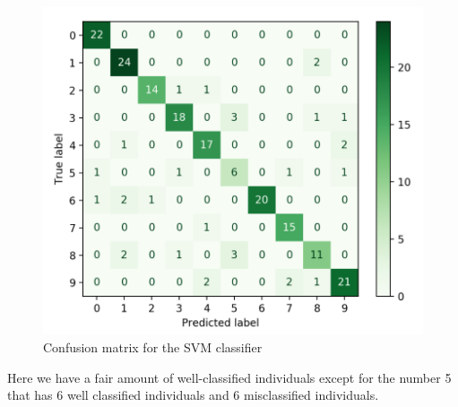 \begin{figure}[h]
	\centering 
	\includegraphics[scale=0.5]{Pics/confusion_matrix}
	\caption{Confusion matrix for the SVM classifier}
	\label{fig:probas}
\end{figure}

Here we have a fair amount of well-classified individuals except for the number 5 that has 6 well classified individuals and 6 misclassified individuals. 
